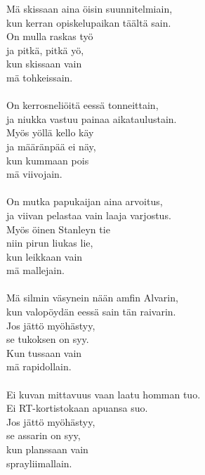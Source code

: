
            Mä skissaan aina öisin suunnitelmiain, \\
            kun kerran opiskelupaikan täältä sain. \\
            On mulla raskas työ \\
            ja pitkä, pitkä yö, \\
            kun skissaan vain \\
            mä tohkeissain. \\
\hspace{10mm} \\
            On kerrosneliöitä eessä tonneittain, \\
            ja niukka vastuu painaa aikataulustain. \\
            Myös yöllä kello käy \\
            ja määränpää ei näy, \\
            kun kummaan pois \\
            mä viivojain. \\
\hspace{10mm} \\
            On mutka papukaijan aina arvoitus, \\
            ja viivan pelastaa vain laaja varjostus. \\
            Myös öinen Stanleyn tie \\
            niin pirun liukas lie, \\
            kun leikkaan vain \\
            mä mallejain. \\
\hspace{10mm} \\
            Mä silmin väsynein nään amfin Alvarin, \\
            kun valopöydän eessä sain tän raivarin. \\
            Jos jättö myöhästyy, \\
            se tukoksen on syy. \\
            Kun tussaan vain \\
            mä rapidollain. \\
\hspace{10mm} \\
            Ei kuvan mittavuus vaan laatu homman tuo. \\
            Ei RT-kortistokaan apuansa suo. \\
            Jos jättö myöhästyy, \\
            se assarin on syy, \\
            kun planssaan vain \\
            sprayliimallain. \\
